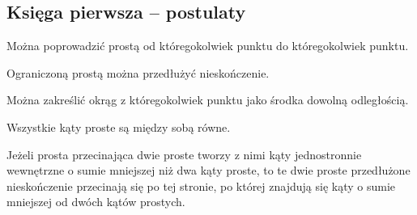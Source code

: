 \subsection{Księga pierwsza -- postulaty}
\setcounter{counter_euclid}{0}

\begin{euclid_postulate}
    Można poprowadzić prostą od któregokolwiek punktu do któregokolwiek punktu.
\end{euclid_postulate}

\begin{euclid_postulate}
    Ograniczoną prostą można przedłużyć nieskończenie.
\end{euclid_postulate}

\begin{euclid_postulate}
    Można zakreślić okrąg z któregokolwiek punktu jako środka dowolną odległością.
\end{euclid_postulate}

\begin{euclid_postulate}
    Wszystkie kąty proste są między sobą równe.
\end{euclid_postulate}

\begin{euclid_postulate}
    Jeżeli prosta przecinająca dwie proste tworzy z nimi kąty jednostronnie wewnętrzne o sumie mniejszej niż dwa kąty proste, to te dwie proste przedłużone nieskończenie przecinają się po tej stronie, po której znajdują się kąty o sumie mniejszej od dwóch kątów prostych.
\end{euclid_postulate}